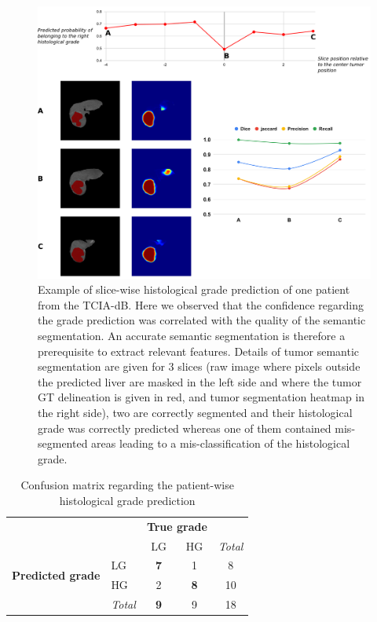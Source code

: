 \documentclass[]{article}
\renewcommand{\arraystretch}{5}
\newcommand{\lmttfont}[1]{{\fontfamily{lmtt}\selectfont #1}}
\begin{document}
\begin{figure}[th!]
	\centering
	\includegraphics[width=0.9\linewidth]{../HistologicalGradePrediction/images/Slice_hist_grad_prediction_details_v2}
	\caption{Example of slice-wise histological grade prediction of one patient from the \lmttfont{TCIA-dB}. Here we observed that the confidence regarding the grade prediction was correlated with the quality of the semantic segmentation. An accurate semantic segmentation is therefore a prerequisite to extract relevant features. Details of tumor semantic segmentation are given for 3 slices (raw image where pixels outside the predicted liver are masked in the left side and where the tumor GT delineation is given in red, and tumor segmentation heatmap in the right side), two are correctly segmented and their histological grade was correctly predicted whereas one of them contained mis-segmented areas leading to a mis-classification of the histological grade.}
	\label{fig:Slice_hist_grad_prediction_details}
\end{figure}




\renewcommand{\arraystretch}{2}
\begin{table}[!htp]\centering
	\caption{Confusion matrix regarding the patient-wise histological grade prediction}\label{tab:confusion_matrix}
	\begin{tabular}{l|l|c|c|c}
		\multicolumn{2}{c}{}&\multicolumn{2}{c}{\textbf{True grade}}&\\
		\cline{3-4}
		\multicolumn{2}{c|}{}&LG&HG&\multicolumn{1}{c}{\textit{Total}}\\
		\cline{2-4}
		\multirow{2}{*}{\textbf{Predicted grade}}& LG & \textbf{7} & 1 & 8\\
		\cline{2-4}
		& HG & 2 & \textbf{8} & 10 \\
		\cline{2-4}
		\multicolumn{1}{c}{} & \multicolumn{1}{c}{\textit{Total}} & \multicolumn{1}{c}{\textbf{9}} & \multicolumn{1}{c}{9} & \multicolumn{1}{c}{18}\\
	\end{tabular}
\end{table}
\renewcommand{\arraystretch}{5}
\end{document}
